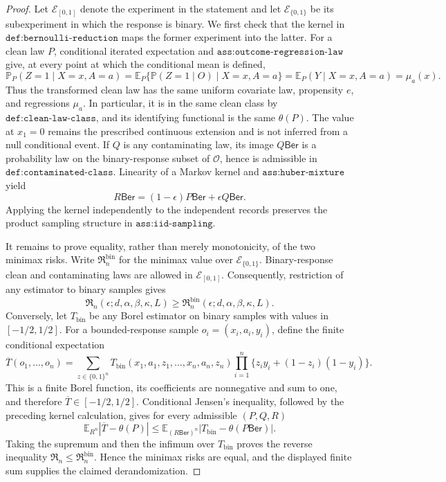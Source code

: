 \documentclass{article}
\begin{document}
\begin{proof}
Let \(\mathcal E_{[0,1]}\) denote the experiment in the statement and let \(\mathcal E_{\{0,1\}}\) be its subexperiment in which the response is binary.  We first check that the kernel in \(\texttt{def:bernoulli-reduction}\) maps the former experiment into the latter.  For a clean law \(P\), conditional iterated expectation and \(\texttt{ass:outcome-regression-law}\) give, at every point at which the conditional mean is defined,
\[
 \mathbb P_P(Z=1\mid X=x,A=a)
 =\mathbb E_P\{\mathbb P(Z=1\mid O)\mid X=x,A=a\}
 =\mathbb E_P(Y\mid X=x,A=a)=\mu_a(x).
\]
Thus the transformed clean law has the same uniform covariate law, propensity \(e\), and regressions \(\mu_a\).  In particular, it is in the same clean class by \(\texttt{def:clean-law-class}\), and its identifying functional is the same \(\theta(P)\).  The value at \(x_1=0\) remains the prescribed continuous extension and is not inferred from a null conditional event.  If \(Q\) is any contaminating law, its image \(Q\mathsf{Ber}\) is a probability law on the binary-response subset of \(\mathcal O\), hence is admissible in \(\texttt{def:contaminated-class}\).  Linearity of a Markov kernel and \(\texttt{ass:huber-mixture}\) yield
\[
 R\mathsf{Ber}=(1-\epsilon)P\mathsf{Ber}+\epsilon Q\mathsf{Ber}.
\]
Applying the kernel independently to the independent records preserves the product sampling structure in \(\texttt{ass:iid-sampling}\).

It remains to prove equality, rather than merely monotonicity, of the two minimax risks.  Write \(\mathfrak R_n^{\mathrm{bin}}\) for the minimax value over \(\mathcal E_{\{0,1\}}\).  Binary-response clean and contaminating laws are allowed in \(\mathcal E_{[0,1]}\).  Consequently, restriction of any estimator to binary samples gives
\[
 \mathfrak R_n(\epsilon;d,\alpha,\beta,\kappa,L)
 \geq \mathfrak R_n^{\mathrm{bin}}(\epsilon;d,\alpha,\beta,\kappa,L).
\]
Conversely, let \(T_{\mathrm{bin}}\) be any Borel estimator on binary samples with values in \([-1/2,1/2]\).  For a bounded-response sample \(o_i=(x_i,a_i,y_i)\), define the finite conditional expectation
\[
 \overline T(o_1,\ldots,o_n)
 =\sum_{z\in\{0,1\}^n}T_{\mathrm{bin}}(x_1,a_1,z_1,\ldots,x_n,a_n,z_n)
   \prod_{i=1}^n\bigl\{z_i y_i+(1-z_i)(1-y_i)\bigr\}.
\]
This is a finite Borel function, its coefficients are nonnegative and sum to one, and therefore \(\overline T\in[-1/2,1/2]\).  Conditional Jensen's inequality, followed by the preceding kernel calculation, gives for every admissible \((P,Q,R)\)
\[
 \mathbb E_{R^n}|\overline T-\theta(P)|
 \leq
 \mathbb E_{(R\mathsf{Ber})^n}|T_{\mathrm{bin}}-\theta(P\mathsf{Ber})|.
\]
Taking the supremum and then the infimum over \(T_{\mathrm{bin}}\) proves the reverse inequality \(\mathfrak R_n\leq\mathfrak R_n^{\mathrm{bin}}\).  Hence the minimax risks are equal, and the displayed finite sum supplies the claimed derandomization.
\end{proof}
\end{document}
